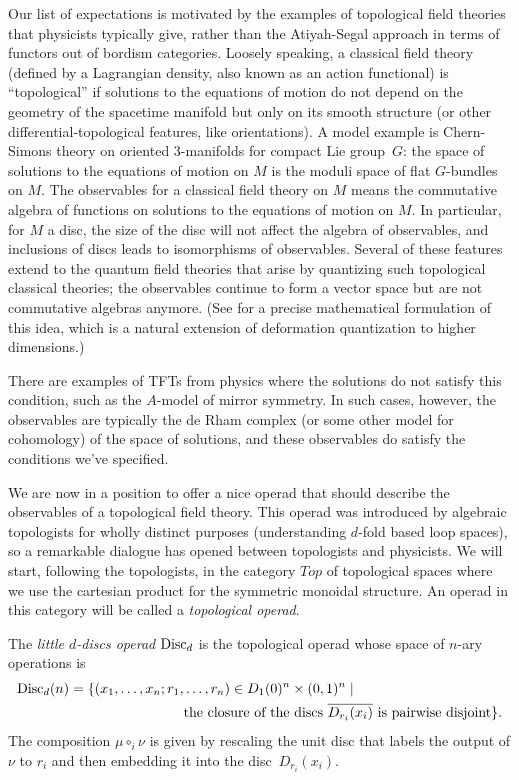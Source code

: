 \documentclass[11pt]{amsart}
\begin{document}
Our list of expectations is motivated by the examples of topological field theories that physicists typically give, rather than the Atiyah-Segal approach in terms of functors out of bordism categories.
Loosely speaking, a classical field theory (defined by a Lagrangian density, also known as an action functional) is ``topological'' if solutions to the equations of motion do not depend on the geometry of the spacetime manifold but only on its smooth structure (or other differential-topological features, like orientations).
A model example is Chern-Simons theory on oriented 3-manifolds for compact Lie group~$G$:
the space of solutions to the equations of motion on $M$ is the moduli space of flat $G$-bundles on $M$.
The observables for a classical field theory on $M$ means the commutative algebra of functions on solutions to the equations of motion on $M$.
In particular, for $M$ a disc, the size of the disc will not affect the algebra of observables,
and inclusions of discs leads to isomorphisms of observables.
Several of these features extend to the quantum field theories that arise by quantizing such topological classical theories;
the observables continue to form a vector space but are not commutative algebras anymore.
(See \cite{CG1, CG2} for a precise mathematical formulation of this idea, which is a natural extension of deformation quantization to higher dimensions.)

\begin{rmk}
There are examples of TFTs from physics where the solutions do not satisfy this condition,
such as the $A$-model of mirror symmetry.
In such cases, however, the observables are typically the de Rham complex (or some other model for cohomology) of the space of solutions,
and these observables do satisfy the conditions we've specified.
\end{rmk}

We are now in a position to offer a nice operad that should describe the observables of a topological field theory.
This operad was introduced by algebraic topologists for wholly distinct purposes (understanding $d$-fold based loop spaces),
so a remarkable dialogue has opened between topologists and physicists.
We will start, following the topologists, in the category $Top$ of topological spaces
where we use the cartesian product for the symmetric monoidal structure.
An operad in this category will be called a {\em topological operad}.

\begin{dfn}
The {\em little $d$-discs operad} ${\rm Disc}_d$ is the topological operad whose space of $n$-ary operations is
\begin{align*}
{\rm Disc}_d(n) = \{ (x_1, \ldots, x_n; r_1, &\ldots, r_n)  \in D_1(0)^n \times (0,1)^n \;|\; \\
&\text{the closure of the discs $\overline{D_{r_i}(x_i)}$ is pairwise disjoint}\}.
\end{align*}
The composition $\mu \circ_i \nu$ is given by rescaling the unit disc that labels the output of $\nu$ to $r_i$ and then embedding it into the disc~$D_{r_i}(x_i)$.
\end{dfn}
\end{document}
